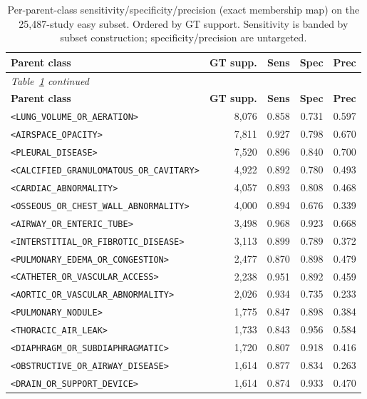 \documentclass[11pt,a4paper]{article}
\begin{document}
\begin{longtable}{p{6.4cm} r r r r}
\caption{Per-parent-class sensitivity/specificity/precision (exact membership map) on the 25{,}487-study easy subset. Ordered by GT support. Sensitivity is banded by subset construction; specificity/precision are untargeted.}
\label{tab:parents}\\
\toprule
\textbf{Parent class} & \textbf{GT supp.} & \textbf{Sens} & \textbf{Spec} & \textbf{Prec} \\
\midrule
\endfirsthead
\multicolumn{5}{l}{\footnotesize\itshape Table~\ref{tab:parents} continued}\\
\toprule
\textbf{Parent class} & \textbf{GT supp.} & \textbf{Sens} & \textbf{Spec} & \textbf{Prec} \\
\midrule
\endhead
\bottomrule
\endfoot
\texttt{<LUNG\_VOLUME\_OR\_AERATION>} & 8{,}076 & 0.858 & 0.731 & 0.597 \\
\texttt{<AIRSPACE\_OPACITY>} & 7{,}811 & 0.927 & 0.798 & 0.670 \\
\texttt{<PLEURAL\_DISEASE>} & 7{,}520 & 0.896 & 0.840 & 0.700 \\
\texttt{<CALCIFIED\_GRANULOMATOUS\_OR\_CAVITARY>} & 4{,}922 & 0.892 & 0.780 & 0.493 \\
\texttt{<CARDIAC\_ABNORMALITY>} & 4{,}057 & 0.893 & 0.808 & 0.468 \\
\texttt{<OSSEOUS\_OR\_CHEST\_WALL\_ABNORMALITY>} & 4{,}000 & 0.894 & 0.676 & 0.339 \\
\texttt{<AIRWAY\_OR\_ENTERIC\_TUBE>} & 3{,}498 & 0.968 & 0.923 & 0.668 \\
\texttt{<INTERSTITIAL\_OR\_FIBROTIC\_DISEASE>} & 3{,}113 & 0.899 & 0.789 & 0.372 \\
\texttt{<PULMONARY\_EDEMA\_OR\_CONGESTION>} & 2{,}477 & 0.870 & 0.898 & 0.479 \\
\texttt{<CATHETER\_OR\_VASCULAR\_ACCESS>} & 2{,}238 & 0.951 & 0.892 & 0.459 \\
\texttt{<AORTIC\_OR\_VASCULAR\_ABNORMALITY>} & 2{,}026 & 0.934 & 0.735 & 0.233 \\
\texttt{<PULMONARY\_NODULE>} & 1{,}775 & 0.847 & 0.898 & 0.384 \\
\texttt{<THORACIC\_AIR\_LEAK>} & 1{,}733 & 0.843 & 0.956 & 0.584 \\
\texttt{<DIAPHRAGM\_OR\_SUBDIAPHRAGMATIC>} & 1{,}720 & 0.807 & 0.918 & 0.416 \\
\texttt{<OBSTRUCTIVE\_OR\_AIRWAY\_DISEASE>} & 1{,}614 & 0.877 & 0.834 & 0.263 \\
\texttt{<DRAIN\_OR\_SUPPORT\_DEVICE>} & 1{,}614 & 0.874 & 0.933 & 0.470 \\

\end{longtable}
\end{document}
